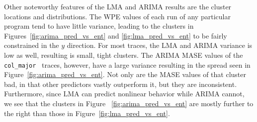 \documentclass{article}
\newcommand{\col}{{\tt col\_major}~}
\begin{document}







 


Other noteworthy features of the LMA and ARIMA results are the cluster locations
and distributions. The WPE values of each run of any particular program tend to
have little variance, leading to the clusters in
Figures~\ref{fig:arima_pred_vs_ent} and \ref{fig:lma_pred_vs_ent} to be fairly
constrained in the $y$ direction. For most traces, the LMA and ARIMA variance is
low as well, resulting is small, tight clusters. The ARIMA MASE values of the \col
traces, however, have a large variance resulting in the spread seen in
Figure~\ref{fig:arima_pred_vs_ent}. Not only are the MASE values of that cluster
bad, in that other predictors vastly outperform it, but they are inconsistent.
Furthermore, since LMA can predict nonlinear behavior while ARIMA cannot, we
see that the clusters in Figure ~\ref{fig:arima_pred_vs_ent} are mostly further to
the right than those in Figure~\ref{fig:lma_pred_vs_ent}.
\end{document}
